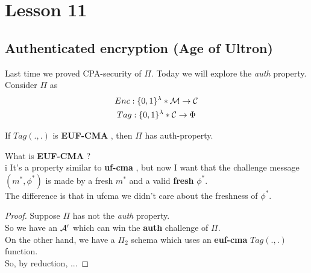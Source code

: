 \chapter*{Lesson 11}
\section{Authenticated encryption (Age of Ultron)}
Last time we proved CPA-security of $\Pi$. Today we will explore the
\textit{auth}  property.
Consider $\Pi$ as
    \begin{gather*} Enc:\{0,1\}^{\lambda}*\mathcal{M} \to \mathcal{C} \\ Tag:\{0,1\}^{\lambda}*\mathcal{C}
    \to \Phi \end{gather*}
   
    \begin{lemma} If $Tag(.,.)$ is \textbf{EUF-CMA} , then $\Pi$ has
    auth-property.  \end{lemma}
    
    What is \textbf{EUF-CMA} ?\\ i
    It's a property similar to \textbf{uf-cma} ,
    but now I want that the challenge message $(m^{*}, \phi^{*})$ is made by a
    fresh $m^{*}$ and a valid \textbf{fresh} $\phi^{*}$.\\ 
    The difference is that in ufcma we didn't care about the freshness of
    $\phi^{*}$.

\begin{proof}
    Suppose $\Pi$ has not the \textit{auth}  property.\\ 
    So we have an $\mathcal{A}'$ which can win the \textbf{auth} challenge of $\Pi$.\\
    On the other hand, we have a $\Pi_{2}$ schema which uses an \textbf{euf-cma}
    $Tag(.,.)$ function.\\
    So, by reduction, ...

\end{proof}
    
